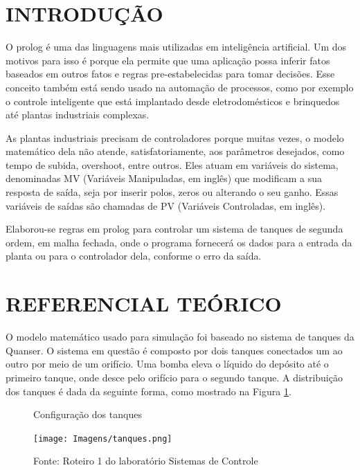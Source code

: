 \documentclass[a4paper,12pt]{article}
\begin{document}
\newpage


\thispagestyle{main}

\section{INTRODUÇÃO}

O prolog é uma das linguagens mais utilizadas em inteligência artificial. Um dos motivos para isso é porque ela permite que uma aplicação possa inferir fatos baseados em outros fatos e regras pre-estabelecidas para tomar decisões. Esse conceito também está sendo usado na automação de processos, como por exemplo o controle inteligente que está implantado desde eletrodomésticos e brinquedos até plantas industriais complexas.

As plantas industriais precisam de controladores porque muitas vezes, o modelo matemático dela não atende, satisfatoriamente, aos parâmetros desejados, como tempo de subida, overshoot, entre outros. Eles atuam em variáveis do sistema, denominadas MV (Variáveis Manipuladas, em inglês) que modificam a sua resposta de saída, seja por inserir polos, zeros ou alterando o seu ganho. Essas variáveis de saídas são chamadas de PV (Variáveis Controladas, em inglês). 

Elaborou-se regras em prolog para controlar um sistema de tanques de segunda ordem, em malha fechada, onde o programa fornecerá os dados para a entrada da planta ou para o controlador dela, conforme o erro da saída.


\newpage


\thispagestyle{main}

\section{REFERENCIAL TEÓRICO}

O modelo matemático usado para simulação foi baseado no sistema de tanques da Quanser. O sistema em questão é composto por dois tanques conectados um ao outro por meio de um orifício. Uma bomba eleva o líquido do depósito até o primeiro tanque, onde desce pelo orifício para o segundo tanque. A distribuição dos tanques é dada da seguinte forma, como mostrado na Figura \ref{Configuração dos tanques}. 

\begin{figure}[ht!]
\caption{Configuração dos tanques \label{Configuração dos tanques}}
\centering
\texttt{[image: Imagens/tanques.png]}
\\
\caption*{Fonte: Roteiro 1 do laboratório Sistemas de Controle  }
\end{figure}
\end{document}
